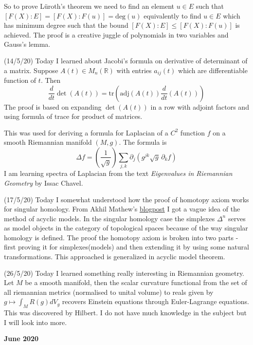 \documentclass[12pt,a4paper]{article}
\begin{document}
So to prove L\"{u}roth's theorem we need to find an element $u \in E$ such that $[F(X):E] =[F(X):F(u)] = \text{deg}(u)$ equivalently to find $u\in E$ which has minimum degree such that the bound $[F(X):E] \le [F(X):F(u)]$ is achieved. The proof is a creative juggle of polynomials in two variables and Gauss's lemma.

(14/5/20) Today I learned about Jacobi's formula on derivative of determinant of a matrix. Suppose $A(t)\in M_n(\mathbb{R})$ with entries $a_{ij}(t)$ which are differentiable function of $t$. Then $$\frac{d}{dt} \det(A(t)) = \text{tr} \left(  \text{adj}(A(t))\frac{d}{dt}(A(t))\right) $$
The proof is based on expanding $\det(A(t))$ in a row with adjoint factors and using formula of trace for product of matrices.

This was used for deriving a formula for Laplacian of a $C^2$ function $f$ on a smooth Riemannian manifold $(M,g)$. The formula is $$\Delta f = (\frac{1}{\sqrt{g}})\sum_{j,k} \partial_j(g^{jk}\sqrt{g}\,\partial_k f)$$
I am learning spectra of Laplacian from the text \textit{Eigenvalues in Riemannian Geometry} by Issac Chavel.

(17/5/20) Today I somewhat understood how the proof of homotopy axiom works for singular homology. From Akhil Mathew's \href{https://amathew.wordpress.com/2010/09/11/the-method-of-acyclic-models/}{blogpost} I got a vague idea of the method of acyclic models. In the singular homology case the simplexes $\Delta^n$ serves as model objects in the category of topological spaces because of the way singular homology is defined. The proof the homotopy axiom is broken into two parts - first proving it for simplexes(models) and then extending it by using some natural transformations. This approached is generalized in acyclic model theorem.

(26/5/20) Today I learned something really interesting in Riemannian geometry. Let $M$ be a smooth manifold, then the scalar curvature functional from the set of all riemannian metrics (normalised to unital volume) to reals given by  $g \mapsto \int_M R(g)dV_g$ recovers Einstein equations through Euler-Lagrange equations. This was discovered by Hilbert. %
  I do not have much knowledge in the subject but I will look into more.
\\

\maketitle\textbf{June 2020}
\\
\end{document}
